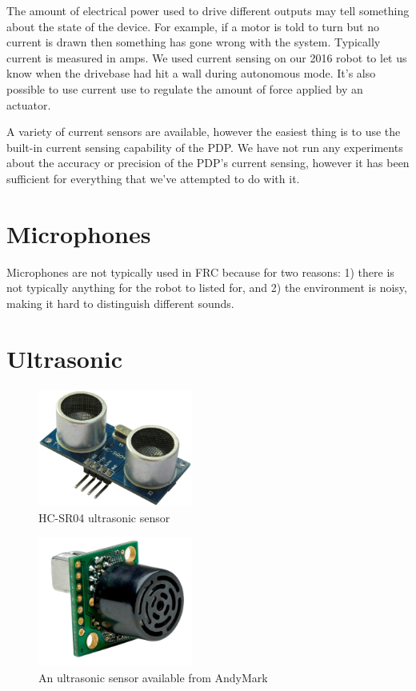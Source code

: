 \documentclass{article}
\begin{document}
The amount of electrical power used to drive different outputs may tell something about the state of the device.  For example, if a motor is told to turn but no current is drawn then something has gone wrong with the system.  Typically current is measured in amps.  
We used current sensing on our 2016 robot to let us know when the drivebase had hit a wall during autonomous mode.  It's also possible to use current use to regulate the amount of force applied by an actuator.  

A variety of current sensors are available, however the easiest thing is to use the built-in current sensing capability of the PDP.  We have not run any experiments about the accuracy or precision of the PDP's current sensing, however it has been sufficient for everything that we've attempted to do with it.  

\section{Microphones}
Microphones are not typically used in FRC because for two reasons: 1) there is not typically anything for the robot to listed for, and 2) the environment is noisy, making it hard to distinguish different sounds.  

\section{Ultrasonic}
\begin{figure}[ht]
\centering
\includegraphics[width=2in]{HC-SR04-lg.jpg}
\caption{HC-SR04 ultrasonic sensor}
\end{figure}

\begin{figure}[ht]
\centering
\includegraphics[width=2in]{ultrasonic.jpg}
\caption{An ultrasonic sensor available from AndyMark}
\end{figure}
\end{document}
